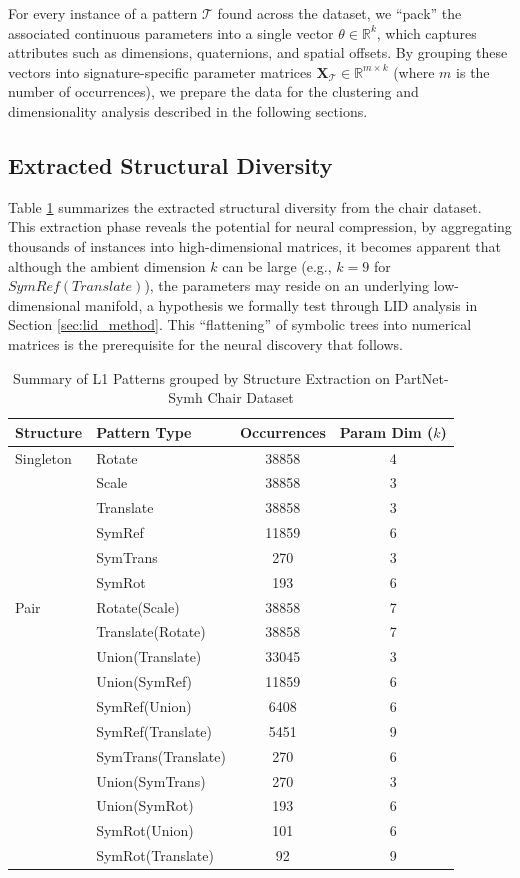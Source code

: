 \documentclass{thesis}
\begin{document}
For every instance of a pattern $\mathcal{T}$ found across the dataset, we ``pack'' the associated continuous parameters into a single vector $\theta \in \mathbb{R}^k$, which captures attributes such as dimensions, quaternions, and spatial offsets. By grouping these vectors into signature-specific parameter matrices $\mathbf{X}_{\mathcal{T}} \in \mathbb{R}^{m \times k}$ (where $m$ is the number of occurrences), we prepare the data for the clustering and dimensionality analysis described in the following sections.

\subsection{Extracted Structural Diversity}
Table \ref{tab:l1_patterns_grouped} summarizes the extracted structural diversity from the chair dataset. This extraction phase reveals the potential for neural compression, by aggregating thousands of instances into high-dimensional matrices, it becomes apparent that although the ambient dimension $k$ can be large (e.g., $k=9$ for $SymRef(Translate)$), the parameters may reside on an underlying low-dimensional manifold, a hypothesis we formally test through LID analysis in Section \ref{sec:lid_method}. This ``flattening'' of symbolic trees into numerical matrices is the prerequisite for the neural discovery that follows.

\begin{table}[!ht]
\caption{Summary of L1 Patterns grouped by Structure Extraction on PartNet-Symh Chair Dataset}
\label{tab:l1_patterns_grouped}
\begin{tabular}{llcc}
\toprule
Structure & Pattern Type & Occurrences & Param Dim ($k$) \\
\midrule
Singleton & Rotate & 38858 & 4 \\
 & Scale & 38858 & 3 \\
 & Translate & 38858 & 3 \\
 & SymRef & 11859 & 6 \\
 & SymTrans & 270 & 3 \\
 & SymRot & 193 & 6 \\
Pair & Rotate(Scale) & 38858 & 7 \\
 & Translate(Rotate) & 38858 & 7 \\
 & Union(Translate) & 33045 & 3 \\
 & Union(SymRef) & 11859 & 6 \\
 & SymRef(Union) & 6408 & 6 \\
 & SymRef(Translate) & 5451 & 9 \\
 & SymTrans(Translate) & 270 & 6 \\
 & Union(SymTrans) & 270 & 3 \\
 & Union(SymRot) & 193 & 6 \\
 & SymRot(Union) & 101 & 6 \\
 & SymRot(Translate) & 92 & 9 \\
\bottomrule
\end{tabular}
\end{table}
\end{document}
